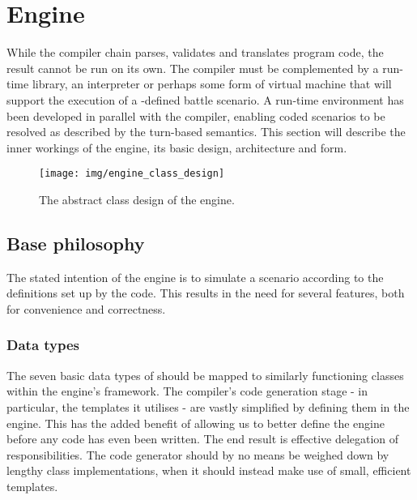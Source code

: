 \section{Engine}
While the \langname{} compiler chain parses, validates and translates program code, the result cannot be run on its own. The compiler must be complemented by a run-time library, an interpreter or perhaps some form of virtual machine that will support the execution of a \langname{}-defined battle scenario. A run-time environment has been developed in parallel with the compiler, enabling coded scenarios to be resolved as described by the turn-based semantics. This section will describe the inner workings of the engine, its basic design, architecture and form.

\begin{figure}
\texttt{[image: img/engine\_class\_design]}
\caption{The abstract class design of the engine.}
\end{figure}

\subsection{Base philosophy}
The stated intention of the engine is to simulate a scenario according to the definitions set up by the \langname{} code. This results in the need for several features, both for convenience and correctness.

\subsubsection{Data types}
The seven basic data types of \langname{} should be mapped to similarly functioning classes within the engine's framework. The compiler's code generation stage - in particular, the templates it utilises - are vastly simplified by defining them in the engine. This has the added benefit of allowing us to better define the engine before any \langname{} code has even been written. The end result is effective delegation of responsibilities. The code generator should by no means be weighed down by lengthy class implementations, when it should instead make use of small, efficient templates.